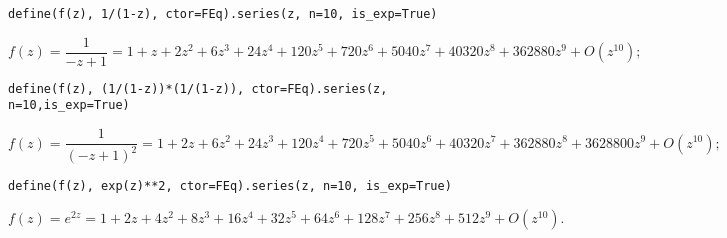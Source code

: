 \begin{verbatim}
define(f(z), 1/(1-z), ctor=FEq).series(z, n=10, is_exp=True)
\end{verbatim}
\begin{displaymath}
f{\left (z \right )} = \frac{1}{- z + 1} = 1 + z + 2 z^{2} + 6 z^{3} + 24 z^{4} + 120 z^{5} + 720 z^{6} + 5040 z^{7} + 40320 z^{8} + 362880 z^{9} + O\left(z^{10}\right);
\end{displaymath}

\begin{verbatim}
define(f(z), (1/(1-z))*(1/(1-z)), ctor=FEq).series(z, n=10,is_exp=True)
\end{verbatim}
\begin{displaymath}
f{\left (z \right )} = \frac{1}{\left(- z + 1\right)^{2}} = 1 + 2 z + 6 z^{2} + 24 z^{3} + 120 z^{4} + 720 z^{5} + 5040 z^{6} + 40320 z^{7} + 362880 z^{8} + 3628800 z^{9} + O\left(z^{10}\right);
\end{displaymath}

\begin{verbatim}
define(f(z), exp(z)**2, ctor=FEq).series(z, n=10, is_exp=True)
\end{verbatim}
\begin{displaymath}
f{\left (z \right )} = e^{2 z} = 1 + 2 z + 4 z^{2} + 8 z^{3} + 16 z^{4} + 32 z^{5} + 64 z^{6} + 128 z^{7} + 256 z^{8} + 512 z^{9} + O\left(z^{10}\right).
\end{displaymath}


